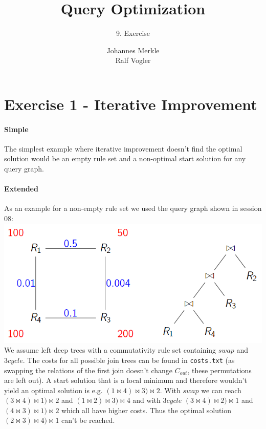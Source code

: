 \documentclass[11pt,a4paper]{scrartcl}
\begin{document}
\author{Johannes Merkle\\Ralf Vogler}
\title{Query Optimization}
\subtitle{9. Exercise}

\maketitle

\section*{Exercise 1 - Iterative Improvement}
\paragraph*{Simple}
The simplest example where iterative improvement doesn't find the optimal solution would be an empty rule set and a non-optimal start solution for any query graph.

\paragraph*{Extended}
As an example for a non-empty rule set we used the query graph shown in session 08:\\
\includegraphics[scale=.8]{graph-and-tree}\\
We assume left deep trees with a commutativity rule set containing $swap$ and $3cycle$.
The costs for all possible join trees can be found in \verb|costs.txt| (as swapping the relations of the first join doesn't change $C_{out}$, these permutations are left out).
A start solution that is a local minimum and therefore wouldn't yield an optimal solution is e.g. $(1 \Join 4)\Join 3)\Join 2$. With $swap$ we can reach $(3 \Join 4)\Join 1)\Join 2$ and $(1 \Join 2)\Join 3)\Join 4$ and with $3cycle$ $(3 \Join 4)\Join 2)\Join 1$ and $(4 \Join 3)\Join 1)\Join 2$ which all have higher costs. Thus the optimal solution $(2 \Join 3)\Join 4)\Join 1$ can't be reached.



\end{document}
